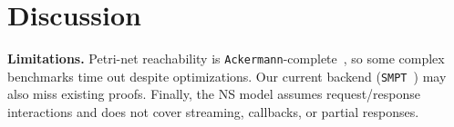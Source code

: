

\section{Discussion}
\label{sec:discussion}



%




\textbf{Limitations.}
Petri-net reachability is \texttt{Ackermann}-complete~\cite{CzWo22}, so some complex benchmarks time out despite optimizations. Our current backend (\texttt{SMPT}~\cite{AmDa23}) may also miss existing proofs. Finally, the NS model assumes request/response interactions and does not cover streaming, callbacks, or partial responses.


